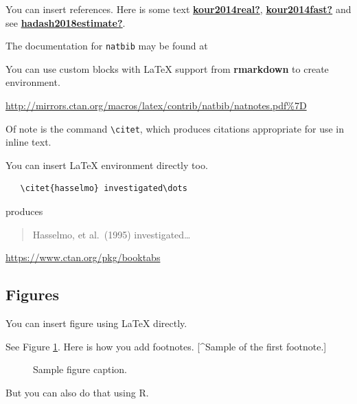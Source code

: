 \documentclass{article}
\newenvironment{Shaded}{\begin{snugshade}}{\end{snugshade}}
\newcommand{\FunctionTok}[1]{\textcolor[rgb]{0.00,0.00,0.00}{#1}}
\newcommand{\NormalTok}[1]{#1}
\newcommand{\SpecialCharTok}[1]{\textcolor[rgb]{0.00,0.00,0.00}{#1}}
\begin{document}
\label{sec:others}

You can insert references. Here is some text
\protect\hyperlink{ref-kour2014real}{\textbf{kour2014real?}},
\protect\hyperlink{ref-kour2014fast}{\textbf{kour2014fast?}} and see
\protect\hyperlink{ref-hadash2018estimate}{\textbf{hadash2018estimate?}}.

The documentation for \verb+natbib+ may be found at

You can use custom blocks with LaTeX support from \textbf{rmarkdown} to
create environment.

\begin{center}
\url{http://mirrors.ctan.org/macros/latex/contrib/natbib/natnotes.pdf\%7D}

\end{center}

Of note is the command \verb+\citet+, which produces citations
appropriate for use in inline text.

You can insert LaTeX environment directly too.

\begin{verbatim}
   \citet{hasselmo} investigated\dots
\end{verbatim}

produces

\begin{quote}
  Hasselmo, et al.\ (1995) investigated\dots
\end{quote}

\begin{center}
  \url{https://www.ctan.org/pkg/booktabs}
\end{center}

\hypertarget{figures}{%
\subsection{Figures}\label{figures}}

You can insert figure using LaTeX directly.

See Figure \ref{fig:fig1}. Here is how you add footnotes. {[}\^{}Sample
of the first footnote.{]}

\begin{figure}
  \centering
  \fbox{\rule[-.5cm]{4cm}{4cm} \rule[-.5cm]{4cm}{0cm}}
  \caption{Sample figure caption.}
  \label{fig:fig1}
\end{figure}

But you can also do that using R.

\begin{Shaded}
\end{Shaded}
\end{document}
